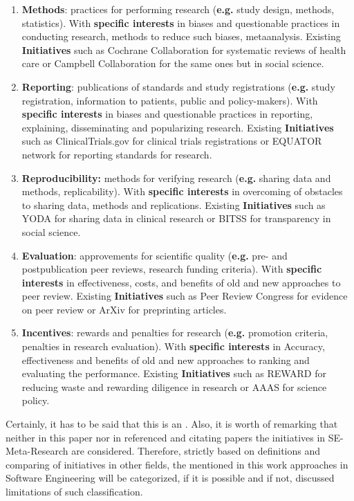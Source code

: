 		\begin{enumerate}
			\item{\textbf{Methods}:} practices for performing research  (\textbf{e.g.} study design, methods, statistics). With \textbf{specific interests} in biases and questionable practices in conducting
			research, methods to reduce such biases, metaanalysis. Existing \textbf{Initiatives} such as Cochrane Collaboration for systematic reviews of health care or Campbell Collaboration for the same ones but in social science.
			   
			\item{\textbf{Reporting}:} publications of standards and study registrations  (\textbf{e.g.} study registration, information to patients, public and policy-makers). With \textbf{specific interests} in biases and questionable practices in reporting, explaining, disseminating and popularizing research. Existing \textbf{Initiatives} such as ClinicalTrials.gov for clinical trials registrations or EQUATOR network for reporting standards for research.
			
			\item\textbf{{Reproducibility}:} methods for verifying research (\textbf{e.g.} sharing data and methods, replicability). With \textbf{specific interests} in overcoming of obstacles to sharing data, methods and replications. Existing \textbf{Initiatives} such as YODA for sharing data in clinical research or BITSS for transparency in social science. 
			
			\item{\textbf{Evaluation}:} approvements for scientific quality (\textbf{e.g.} pre- and postpublication peer reviews, research funding criteria). With \textbf{specific interests} in  effectiveness, costs, and benefits of old and new approaches to peer review. Existing \textbf{Initiatives} such as Peer Review Congress for evidence on peer review or ArXiv for preprinting articles. 
			 
			\item{\textbf{Incentives}:} rewards and penalties for research (\textbf{e.g.} promotion criteria, penalties in research evaluation). With \textbf{specific interests} in Accuracy, effectiveness and benefits of old and new approaches to ranking and evaluating the performance. Existing \textbf{Initiatives} such as REWARD for reducing waste and rewarding diligence in research or AAAS for science policy.
		\end{enumerate}
		 Certainly, it has to be said that this is an \frqq. Also, it is worth of remarking that neither in this paper nor in referenced and citating papers the initiatives in SE-Meta-Research are considered. Therefore, strictly based on definitions and comparing of initiatives in other fields, the mentioned in this work approaches in Software Engineering will be categorized, if it is possible and if not, discussed limitations of such classification. 
		
